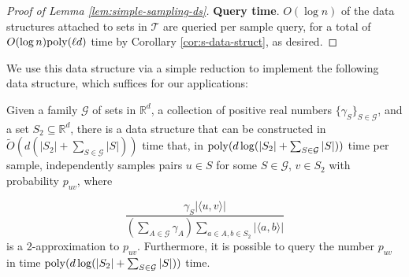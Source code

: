 \begin{proof}[Proof of Lemma \ref{lem:simple-sampling-ds}]
\textbf{Query time}. $O(\log n)$ of the data structures attached to sets in $\mathcal{T}$ are queried per sample query, for a total of $O(\log n)\mathrm{poly}(\ell d)$ time by Corollary \ref{cor:s-data-struct}, as desired.

\end{proof}

We use this data structure via a simple reduction to implement the following data structure, which suffices for our applications:

\begin{proposition}\label{prop:main-sampling-ds}
Given a family $\mathcal G$ of sets in $\mathbb{R}^d$, a collection of positive real numbers $\{\gamma_S\}_{S\in \mathcal G}$, and a set $S_2\subseteq \mathbb{R}^d$, there is a data structure that can be constructed in $\tilde{O}(d(|S_2| + \sum_{S\in \mathcal G} |S|))$ time that, in $\mathrm{poly}(d\log(|S_2| + \sum_{S\in \mathcal G} |S|))$ time per sample, independently samples pairs $u\in S$ for some $S\in \mathcal G$, $v\in S_2$ with probability $p_{uv}$, where

$$\frac{\gamma_S |\langle u,v\rangle|}{(\sum_{A\in \mathcal G} \gamma_A) \sum_{a\in A,b\in S_2} |\langle a,b\rangle|}$$
is a 2-approximation to $p_{uv}$. Furthermore, it is possible to query the number $p_{uv}$ in time $\mathrm{poly}(d\log(|S_2| + \sum_{S\in \mathcal G} |S|))$ time.
\end{proposition}

